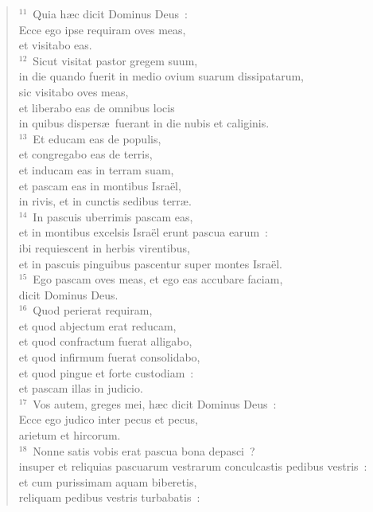 \begin{verse}${}^{11}$~Quia h\ae c dicit Dominus Deus~:\\ Ecce ego ipse requiram oves meas,\\ et visitabo eas.\\
${}^{12}$~Sicut visitat pastor gregem suum,\\ in die quando fuerit in medio ovium suarum dissipatarum,\\ sic visitabo oves meas,\\ et liberabo eas de omnibus locis\\ in quibus dispers\ae\ fuerant in die nubis et caliginis.\\
${}^{13}$~Et educam eas de populis,\\ et congregabo eas de terris,\\ et inducam eas in terram suam,\\ et pascam eas in montibus Isra\"el,\\ in rivis, et in cunctis sedibus terr\ae .\\
${}^{14}$~In pascuis uberrimis pascam eas,\\ et in montibus excelsis Isra\"el erunt pascua earum~:\\ ibi requiescent in herbis virentibus,\\ et in pascuis pinguibus pascentur super montes Isra\"el.\\
${}^{15}$~Ego pascam oves meas, et ego eas accubare faciam,\\ dicit Dominus Deus.\\
${}^{16}$~Quod perierat requiram,\\ et quod abjectum erat reducam,\\ et quod confractum fuerat alligabo,\\ et quod infirmum fuerat consolidabo,\\ et quod pingue et forte custodiam~:\\ et pascam illas in judicio.\\
${}^{17}$~Vos autem, greges mei, h\ae c dicit Dominus Deus~:\\ Ecce ego judico inter pecus et pecus,\\ arietum et hircorum.\\
${}^{18}$~Nonne satis vobis erat pascua bona depasci~?\\ insuper et reliquias pascuarum vestrarum conculcastis pedibus vestris~:\\ et cum purissimam aquam biberetis,\\ reliquam pedibus vestris turbabatis~:\\

\end{verse}
